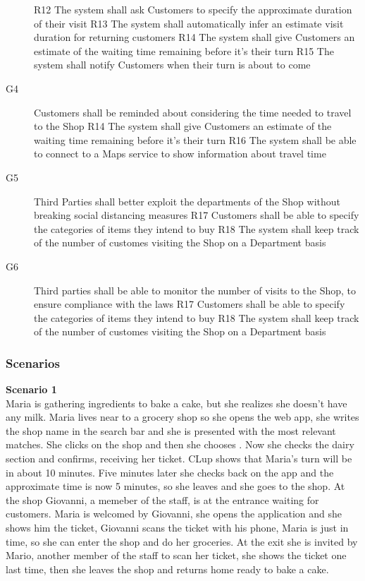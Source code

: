 \begin{description}
          \subitem R12 The system shall ask Customers to specify the approximate duration of their visit
          \subitem R13 The system shall automatically infer an estimate visit duration for returning customers
          \subitem R14 The system shall give Customers an estimate of the waiting time remaining before it's their turn
          \subitem R15 The system shall notify Customers when their turn is about to come
    \item [G4]  Customers shall be reminded about considering the time needed to travel to the Shop
          \subitem R14 The system shall give Customers an estimate of the waiting time remaining before it's their turn
          \subitem R16 The system shall be able to connect to a Maps service to show information about travel time
    \item [G5]  Third Parties shall better exploit the departments of the Shop without breaking social distancing measures
          \subitem R17 Customers shall be able to specify the categories of items they intend to buy
          \subitem R18 The system shall keep track of the number of customes visiting the Shop on a Department basis
    \item [G6]  Third parties shall be able to monitor the number of visits to the Shop, to ensure compliance with the laws
          \subitem R17 Customers shall be able to specify the categories of items they intend to buy
          \subitem R18 The system shall keep track of the number of customes visiting the Shop on a Department basis
\end{description}

\subsubsection{Scenarios}
\textbf{Scenario 1}\\
Maria is gathering ingredients to bake a cake, but she realizes she doesn't have any milk.
Maria lives near to a grocery shop so she opens the web app, she writes the shop name in the search bar and she is presented with the most relevant matches. She clicks on the shop and then she chooses . Now she checks the dairy section and confirms, receiving her ticket.
CLup shows that Maria's turn will be in about 10 minutes. Five minutes later she checks back on the app and the approximate time is now 5 minutes, so she leaves and she goes to the shop.
At the shop Giovanni, a memeber of the staff, is at the entrance waiting for customers. Maria is welcomed by Giovanni, she opens the application and she shows him the ticket, Giovanni scans the ticket with his phone, Maria is just in time, so she can enter the shop and do her groceries.
At the exit she is invited by Mario, another member of the staff to scan her ticket, she shows the ticket one last time, then she leaves the shop and returns home ready to bake a cake.

